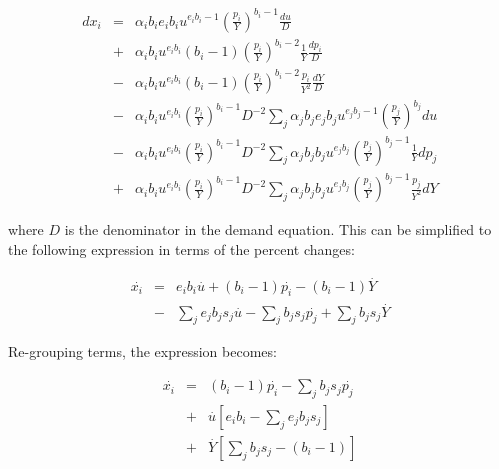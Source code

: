 \[\begin{array}{*{20}{l}}
{d{x_i}}& = &\displaystyle {{\alpha _i}{b_i}{e_i}{b_i}{u^{{e_i}{b_i} - 1}}{{\left( {\frac{{{p_i}}}{Y}} \right)}^{{b_i} - 1}}\frac{{du}}{D}}\\
{}& + &\displaystyle {{\alpha _i}{b_i}{u^{{e_i}{b_i}}}\left( {{b_i} - 1} \right){{\left( {\frac{{{p_i}}}{Y}} \right)}^{{b_i} - 2}}\frac{1}{Y}\frac{{d{p_i}}}{D}}\\
{}& - &\displaystyle {{\alpha _i}{b_i}{u^{{e_i}{b_i}}}\left( {{b_i} - 1} \right){{\left( {\frac{{{p_i}}}{Y}} \right)}^{{b_i} - 2}}\frac{{{p_i}}}{{{Y^2}}}\frac{{dY}}{D}}\\
{}& - &\displaystyle {{\alpha _i}{b_i}{u^{{e_i}{b_i}}}{{\left( {\frac{{{p_i}}}{Y}} \right)}^{{b_i} - 1}}{D^{ - 2}}\sum\limits_j {{\alpha _j}{b_j}{e_j}{b_j}{u^{{e_j}{b_j} - 1}}{{\left( {\frac{{{p_j}}}{Y}} \right)}^{{b_j}}}du} }\\
{}& - &\displaystyle {{\alpha _i}{b_i}{u^{{e_i}{b_i}}}{{\left( {\frac{{{p_i}}}{Y}} \right)}^{{b_i} - 1}}{D^{ - 2}}\sum\limits_j {{\alpha _j}{b_j}{b_j}{u^{{e_j}{b_j}}}{{\left( {\frac{{{p_j}}}{Y}} \right)}^{{b_j} - 1}}\frac{1}{Y}d{p_j}} }\\
{}& + &\displaystyle {{\alpha _i}{b_i}{u^{{e_i}{b_i}}}{{\left( {\frac{{{p_i}}}{Y}} \right)}^{{b_i} - 1}}{D^{ - 2}}\sum\limits_j {{\alpha _j}{b_j}{b_j}{u^{{e_j}{b_j}}}{{\left( {\frac{{{p_j}}}{Y}} \right)}^{{b_j} - 1}}\frac{{{p_j}}}{{{Y^2}}}dY} }
\end{array}\]

\noindent where $D$ is the denominator in the demand equation. This can be simplified to the following expression in terms of the percent changes:

\[\begin{array}{*{20}{l}}
\overset{.}{x_i}& = &\displaystyle
e_i b_i \overset{.}{u} +
\left( b_i - 1 \right) \overset{.}{p_i} -
\left( b_i - 1 \right) \overset{.}{Y} \\
{}& - &\displaystyle
\sum\limits_j {e_j b_j s_j} \overset{.}{u}  -
\sum\limits_j {b_j s_j \overset{.}{p_j}} +
\sum\limits_j {b_j s_j} \overset{.}{Y}
\end{array}\]

\noindent Re-grouping terms, the expression becomes:

\[\begin{array}{*{20}{l}}
\overset{.}{x_i}& = &(b_i - 1)\overset{.}{p_i} - \sum\limits_j {b_j s_j \overset{.}{p_j}} \\
{}& + & \overset{.}{u}\left[ e_i b_i - \sum\limits_j {e_j b_j s_j } \right]\\
{}& + & \overset{.}{Y}\left[ \sum\limits_j {b_j s_j}  - \left( b_i - 1 \right) \right]
\end{array}\]

